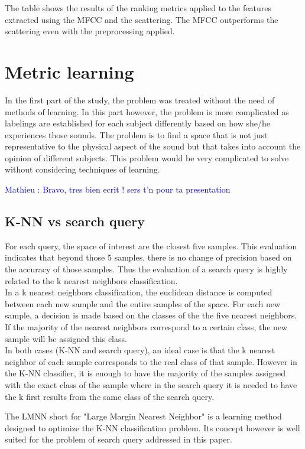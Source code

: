 \documentclass[hidelinks,12pt]{report}
\newcommand{\ml}[1]{\textcolor{blue}{ Mathieu : #1}}
\begin{document}
The table shows the results of the ranking metrics applied to the features extracted using the MFCC and the scattering. The MFCC outperforms the scattering even with the preprocessing applied.

\section{Metric learning}

In the first part of the study, the problem was treated without the need of methods of learning. In this part however, the problem is more complicated as labelings are established for each subject differently  based on how she/he experiences those sounds. The problem is to find a space that is not just representative to the physical aspect of the sound but that takes into account the opinion of different subjects. This problem would be very complicated to solve without considering techniques of learning. 

\ml{Bravo, tres bien ecrit ! sers t'n pour ta presentation}

\subsection{K-NN vs search query}
For each query, the space of interest are the closest five samples. This evaluation indicates that beyond those 5 samples, there is no change of precision based on the accuracy of those samples. Thus the evaluation of a search query is highly related to the k nearest neighbors classification.\\
In a k nearest neighbors classification, the euclidean distance is computed between each new sample and the entire samples of the space. For each new sample, a decision is made based on the classes of the the five nearest neighbors. If the majority of the nearest neighbors correspond to a certain class, the new sample will be assigned this class.\\
In both cases (K-NN and search query), an ideal case is that the k nearest neighbor of each sample corresponds to the real class of that sample. However in the K-NN classifier, it is enough to have the majority of the samples assigned with the exact class of the sample where in the search query it is needed to have the k first results from the same class of the search query.\par
The LMNN short for "Large Margin Nearest Neighbor" is a learning method designed to optimize the K-NN classification problem. Its concept however is well suited for the problem of search query addressed in this paper.
\end{document}

